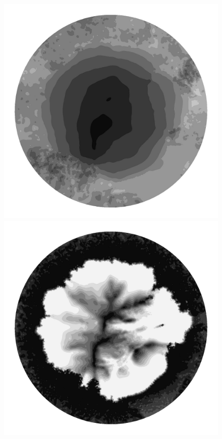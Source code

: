 \begin{figure}
  \begin{minipage}[b]{0.30\linewidth}
    \includegraphics[width=1.0\textwidth]{images/EISMINT_II/U/S_10000.jpg}
  \end{minipage}
  \quad
  \begin{minipage}[b]{0.30\linewidth}
    \includegraphics[width=1.0\textwidth]{images/EISMINT_II/U/beta_10000.jpg}

\end{minipage}
\end{figure}
